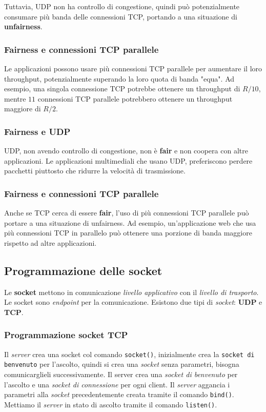 Tuttavia, UDP non ha controllo di congestione, quindi può potenzialmente consumare più banda delle connessioni TCP, portando a una situazione di \textbf{unfairness}.

\subsubsection*{Fairness e connessioni TCP parallele}
Le applicazioni possono usare più connessioni TCP parallele per aumentare il loro throughput, potenzialmente superando la loro quota di banda "equa". Ad esempio, una singola connessione TCP potrebbe ottenere un throughput di $R/10$, mentre $11$ connessioni TCP parallele potrebbero ottenere un throughput maggiore di $R/2$.

\subsubsection*{Fairness e UDP}
UDP, non avendo controllo di congestione, non è \textbf{fair} e non coopera con altre applicazioni. Le applicazioni multimediali che usano UDP, preferiscono perdere pacchetti piuttosto che ridurre la velocità di trasmissione.

\subsubsection*{Fairness e connessioni TCP parallele}
Anche se TCP cerca di essere \textbf{fair}, l'uso di più connessioni TCP parallele può portare a una situazione di unfairness. Ad esempio, un'applicazione web che usa più connessioni TCP in parallelo può ottenere una porzione di banda maggiore rispetto ad altre applicazioni.

\subsection{Programmazione delle socket}
Le \textbf{socket} mettono in comunicazione \textit{livello applicativo} con il \textit{livello di trasporto}. Le socket sono \textit{endpoint} per la comunicazione. Esistono due tipi di \textit{socket}: \textbf{UDP} e \textbf{TCP}.

\subsubsection{Programmazione socket TCP}
Il \textit{server} crea una socket col comando \texttt{socket()}, inizialmente crea la \texttt{socket di benvenuto} per l'ascolto, quindi si crea una \textit{socket} senza parametri, bisogna comunicarglieli successivamente. Il server crea una \textit{socket di benvenuto} per l'ascolto e una \textit{socket di connessione} per ogni client.
Il \textit{server} aggancia i parametri alla \textit{socket} precedentemente creata tramite il comando \texttt{bind()}. Mettiamo il \textit{server} in stato di ascolto tramite il comando \texttt{listen()}.

